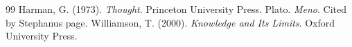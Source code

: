\documentclass{situationist-preprint}
\begin{document}
\begin{thebibliography}{99}\small
{} Harman, G. (1973). \emph{Thought}. Princeton University Press.
 Plato. \emph{Meno}. Cited by Stephanus page.
 Williamson, T. (2000). \emph{Knowledge and Its Limits}. Oxford University Press.
\end{thebibliography}
\end{document}
